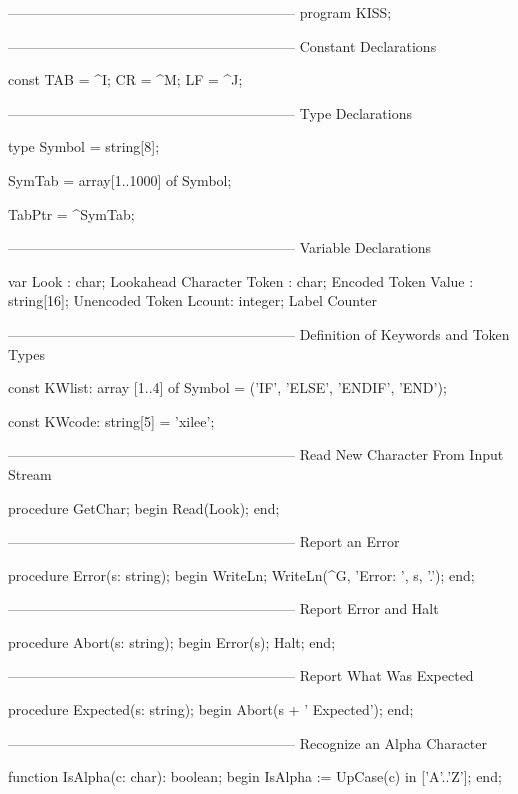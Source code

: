 \documentclass[float=false, crop=false]{standalone}
\begin{document}
\begin{code}
{--------------------------------------------------------------}
program KISS;

{--------------------------------------------------------------}
{ Constant Declarations }

const TAB = ^I;
      CR  = ^M;
      LF  = ^J;

{--------------------------------------------------------------}
{ Type Declarations  }

type Symbol = string[8];

     SymTab = array[1..1000] of Symbol;

     TabPtr = ^SymTab;


{--------------------------------------------------------------}
{ Variable Declarations }

var Look  : char;              { Lookahead Character }
    Token : char;              { Encoded Token       }
    Value : string[16];        { Unencoded Token     }
    Lcount: integer;           { Label Counter       }


{--------------------------------------------------------------}
{ Definition of Keywords and Token Types }

const KWlist: array [1..4] of Symbol =
              ('IF', 'ELSE', 'ENDIF', 'END');

const KWcode: string[5] = 'xilee';


{--------------------------------------------------------------}
{ Read New Character From Input Stream }

procedure GetChar;
begin
   Read(Look);
end;

{--------------------------------------------------------------}
{ Report an Error }

procedure Error(s: string);
begin
   WriteLn;
   WriteLn(^G, 'Error: ', s, '.');
end;


{--------------------------------------------------------------}
{ Report Error and Halt }

procedure Abort(s: string);
begin
   Error(s);
   Halt;
end;


{--------------------------------------------------------------}
{ Report What Was Expected }

procedure Expected(s: string);
begin
   Abort(s + ' Expected');
end;

{--------------------------------------------------------------}
{ Recognize an Alpha Character }

function IsAlpha(c: char): boolean;
begin
   IsAlpha := UpCase(c) in ['A'..'Z'];
end;



\end{code}
\end{document}
